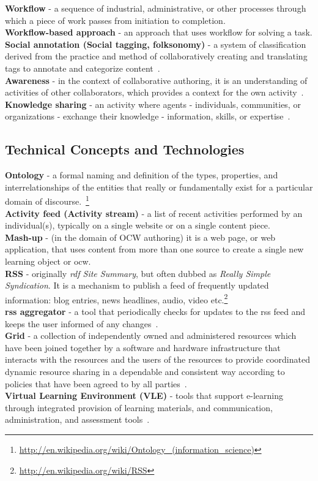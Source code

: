 \documentclass[PhD, Submit, ngerman,UKenglish,table]{scrbook}
\begin{document}
\textbf{Workflow} - a sequence of industrial, administrative, or other processes through which a piece of work passes from initiation to completion.\\
\textbf{Workflow-based approach} - an approach that uses workflow for solving a task.\\
\textbf{Social annotation (Social tagging, folksonomy)} - a system of classification derived from the practice and method of collaboratively creating and translating tags to annotate and categorize content~\cite{peters2009folksonomies}.\\
\textbf{Awareness} - in the context of collaborative authoring, it is an understanding of activities of other collaborators, which provides a context for the own activity~\cite{Halimi2011}.\\
\textbf{Knowledge sharing} - an activity where agents - individuals, communities, or organizations - exchange their knowledge - information, skills, or expertise~\cite{ireson2010knowledge}.\\

\subsection{Technical Concepts and Technologies}
\textbf{Ontology} - a formal naming and definition of the types, properties, and interrelationships of the entities that really or fundamentally exist for a particular domain of discourse.~\footnote{\url{http://en.wikipedia.org/wiki/Ontology_(information_science)}}\\
\textbf{Activity feed (Activity stream)} - a list of recent activities performed by an individual(s), typically on a single website or on a single content piece.\\
\textbf{Mash-up} - (in the domain of OCW authoring) it is a web page, or web application, that uses content from more than one source to create a single new learning object or \gls{ocw}.\\
\textbf{RSS} - originally \emph{\gls{rdf} Site Summary}, but often dubbed as \emph{Really Simple Syndication}.
It is a mechanism to publish a feed of frequently updated information: blog entries, news headlines, audio, video etc.\footnote{\url{http://en.wikipedia.org/wiki/RSS}}\\
\textbf{\gls{rss} aggregator} - a tool that periodically checks for updates to the \gls{rss} feed and keeps the user informed of any changes~\cite{andersen2007web}.\\
\textbf{Grid} - a collection of independently owned and administered resources which have been joined together by a software and hardware infrastructure that interacts with the resources and the users of the resources to provide coordinated dynamic resource sharing in a dependable and consistent way according to policies that have been agreed to by all parties~\cite{hamid2010efficient}.\\
\textbf{Virtual Learning Environment (VLE)} - tools that support e-learning through integrated provision of learning materials, and communication, administration, and assessment tools~\cite{Currier2002}.\\
\end{document}
